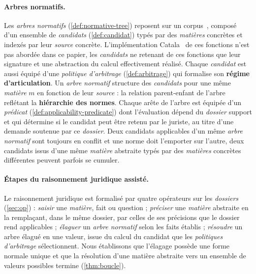 \paragraph{Arbres normatifs.} %
Les \emph{arbres normatifs} (\autoref{def:normative-tree}) reposent sur un corpus~\cite{corpuslumo}, composé d'un ensemble de \emph{candidats} (\autoref{def:candidat}) typés par des \emph{matières} concrètes et indexés par leur \emph{source} concrète. L'implémentation Catala~\cite{merigoux2021} de ces fonctions n'est pas abordée dans ce papier, les \emph{candidats} ne retenant de ces fonctions que leur signature et une abstraction du calcul effectivement réalisé. Chaque \emph{candidat} est aussi équipé d'une \emph{politique d'arbitrage} (\autoref{def:arbitrage}) qui formalise son
\textbf{régime d'articulation}.  Un \emph{arbre normatif} structure des \emph{candidats} pour une même \emph{matière} $m$ en fonction de leur \emph{source} : la relation parent-enfant de l'arbre reflétant la \textbf{hiérarchie des normes}. Chaque arête de l'arbre est équipée d'un \emph{prédicat} (\autoref{def:applicability-predicate}) dont l'évaluation dépend du \emph{dossier} support et qui détermine si le candidat peut être retenu par le juriste, au titre d'une demande soutenue par ce \emph{dossier}. Deux candidats applicables d'un même \emph{arbre normatif} sont toujours en conflit et une norme doit l'emporter sur l'autre, deux candidats issus d'une même \emph{matière} abstraite typés par des \emph{matières} concrètes différentes peuvent parfois se cumuler. 

\paragraph{Étapes du raisonnement juridique assisté.}
Le raisonnement juridique est formalisé par quatre opérateurs sur les \emph{dossiers} (\autoref{sec:op}) : \emph{saisir} une \emph{matière}, fait ou question ; \emph{préciser} une \emph{matière} abstraite en la remplaçant, dans le même dossier, par celles de ses précisions que le dossier rend applicables ; \emph{élaguer} un \emph{arbre normatif} selon les faits établis ; \emph{résoudre} un arbre élagué en une valeur, issue du calcul du candidat que les \emph{politiques d'arbitrage} sélectionnent. Nous établissons que l'élagage possède une forme normale unique et que la résolution d'une matière abstraite vers un ensemble de valeurs possibles termine (\autoref{thm:boucle}). 

